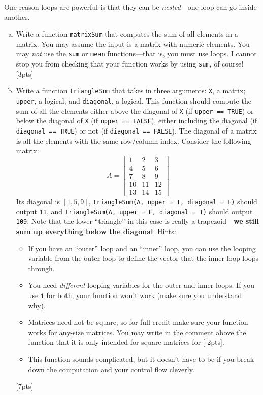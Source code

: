 \documentclass[12pt]{article}
\begin{document}
One reason loops are powerful is that they can be \textit{nested}---one loop can go inside another.

\begin{enumerate}[(a)]
	\item Write a function \verb|matrixSum| that computes the sum of all elements in a matrix. You may assume the input is a matrix with numeric elements. You may \textit{not} use the \verb|sum| or \verb|mean| functions---that is, you must use loops. I cannot stop you from checking that your function works by using \verb|sum|, of course! [3pts]
	\item Write a function \verb|triangleSum| that takes in three arguments: \verb|X|, a matrix; \verb|upper|, a logical; and \verb|diagonal|, a logical. This function should compute the sum of all the elements either above the diagonal of \verb|X| (if \verb|upper == TRUE|) or below the diagonal of \verb|X| (if \verb|upper == FALSE|), either including the diagonal (if \verb|diagonal == TRUE|) or not (if \verb|diagonal == FALSE|). The diagonal of a matrix is all the elements with the same row/column index. Consider the following matrix:
	\[A =
	\begin{bmatrix}
	1 & 2 & 3 \\
	4 & 5 & 6 \\
	7 & 8 & 9 \\
	10 & 11 & 12 \\
	13 & 14 & 15
	\end{bmatrix}\]
	Its diagonal is $[1,5,9]$, \verb|triangleSum(A, upper = T, diagonal = F)| should output \verb|11|, and \verb|triangleSum(A, upper = F, diagonal = T)| should output \verb|109|. Note that the lower ``triangle'' in this case is really a trapezoid---\textbf{we still sum up everything below the diagonal}.
	Hints:
	\begin{itemize}
		\item If you have an ``outer'' loop and an ``inner'' loop, you can use the looping variable from the outer loop to define the vector that the inner loop loops through.
		\item You need \textit{different} looping variables for the outer and inner loops. If you use \verb|i| for both, your function won't work (make sure you understand why).
		\item Matrices need not be square, so for full credit make sure your function works for any-size matrices. You may write in the comment above the function that it is only intended for square matrices for [-2pts].
		\item This function sounds complicated, but it doesn't have to be if you break down the computation and your control flow cleverly.
	\end{itemize}
	[7pts]
\end{enumerate}
\end{document}

